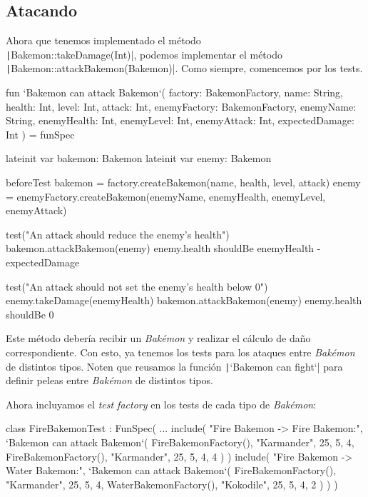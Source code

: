  \subsection{Atacando}

  Ahora que tenemos implementado el método \\\texttt|Bakemon::takeDamage(Int)|, podemos
  implementar el método \texttt|Bakemon::attackBakemon(Bakemon)|.
  Como siempre, comencemos por los tests.

  \begin{kotlin}
    fun `Bakemon can attack Bakemon`(
      factory: BakemonFactory,
      name: String,
      health: Int,
      level: Int,
      attack: Int,
      enemyFactory: BakemonFactory,
      enemyName: String,
      enemyHealth: Int,
      enemyLevel: Int,
      enemyAttack: Int,
      expectedDamage: Int
    ) = funSpec {
      lateinit var bakemon: Bakemon
      lateinit var enemy: Bakemon

      beforeTest {
        bakemon = factory.createBakemon(name, health, level, attack)
        enemy = enemyFactory.createBakemon(enemyName, enemyHealth, enemyLevel, enemyAttack)
      }

      test("An attack should reduce the enemy's health") {
        bakemon.attackBakemon(enemy)
        enemy.health shouldBe enemyHealth - expectedDamage
      }

      test("An attack should not set the enemy's health below 0") {
        enemy.takeDamage(enemyHealth)
        bakemon.attackBakemon(enemy)
        enemy.health shouldBe 0
      }
    }
  \end{kotlin}

  Este método debería recibir un \textit{Bakémon} y realizar el cálculo de daño correspondiente.
  Con esto, ya tenemos los tests para los ataques entre \textit{Bakémon} de distintos tipos.
  Noten que reusamos la función \texttt|`Bakemon can fight`| para definir peleas entre
  \textit{Bakémon} de distintos tipos.
  
  Ahora incluyamos el \textit{test factory} en los tests de cada tipo de \textit{Bakémon}:

  \begin{kotlin}
    class FireBakemonTest : FunSpec({
      ...
      include(
        "Fire Bakemon -> Fire Bakemon:",
        `Bakemon can attack Bakemon`(
          FireBakemonFactory(), "Karmander", 25, 5, 4,
          FireBakemonFactory(), "Karmander", 25, 5, 4, 4
        )
      )
      include(
        "Fire Bakemon -> Water Bakemon:",
        `Bakemon can attack Bakemon`(
          FireBakemonFactory(), "Karmander", 25, 5, 4,
          WaterBakemonFactory(), "Kokodile", 25, 5, 4, 2
        )
      )
    })
  \end{kotlin}

